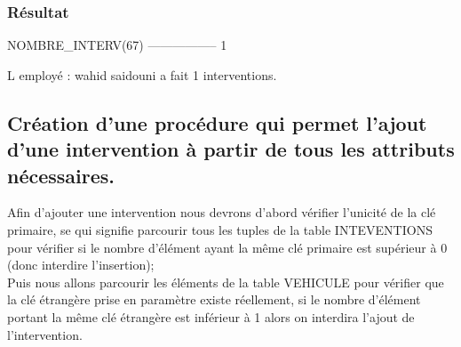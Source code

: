 \documentclass[•]{article}
\begin{document}
\subsubsection{Résultat}
\begin{sql}
NOMBRE_INTERV(67)
-----------------
                1

L employé : wahid saidouni a fait 1 interventions.
\end{sql}





\subsection{Création d'une procédure qui permet l'ajout d'une intervention à partir de tous les attributs nécessaires.}
Afin d'ajouter une intervention nous devrons d'abord vérifier l'unicité de la clé primaire, se qui signifie parcourir tous les tuples de la table INTEVENTIONS pour vérifier si le nombre d'élément ayant la même clé primaire est supérieur à 0 (donc interdire l'insertion);\\
Puis nous allons parcourir les éléments de la table VEHICULE pour vérifier que la clé étrangère prise en paramètre existe réellement, si le nombre d'élément portant la même clé étrangère est inférieur à 1 alors on interdira l'ajout de l'intervention.
\end{document}
